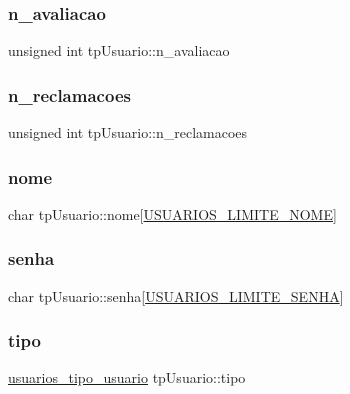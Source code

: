 \subsubsection{\texorpdfstring{n\+\_\+avaliacao}{n\_avaliacao}}
{\footnotesize\ttfamily unsigned int tp\+Usuario\+::n\+\_\+avaliacao}

\mbox{\label{structtpUsuario_a4aed6ac960a0dfadc0a3f8c2777b3709}} 
\subsubsection{\texorpdfstring{n\+\_\+reclamacoes}{n\_reclamacoes}}
{\footnotesize\ttfamily unsigned int tp\+Usuario\+::n\+\_\+reclamacoes}

\mbox{\label{structtpUsuario_a069080ebc30772aa5fd2898e7678c105}} 
\subsubsection{\texorpdfstring{nome}{nome}}
{\footnotesize\ttfamily char tp\+Usuario\+::nome\mbox{[}\hyperlink{usuarios_8h_a0366566babff2729e59e21514e8732fe}{U\+S\+U\+A\+R\+I\+O\+S\+\_\+\+L\+I\+M\+I\+T\+E\+\_\+\+N\+O\+ME}\mbox{]}}

\mbox{\label{structtpUsuario_a6ee0e2c16c084ede5698b3df0b10a590}} 
\subsubsection{\texorpdfstring{senha}{senha}}
{\footnotesize\ttfamily char tp\+Usuario\+::senha\mbox{[}\hyperlink{usuarios_8h_a66457e61856e5ef8d5f67f16ce7c1145}{U\+S\+U\+A\+R\+I\+O\+S\+\_\+\+L\+I\+M\+I\+T\+E\+\_\+\+S\+E\+N\+HA}\mbox{]}}

\mbox{\label{structtpUsuario_abaed1508280c5655463a1ceae4cb3050}} 
\subsubsection{\texorpdfstring{tipo}{tipo}}
{\footnotesize\ttfamily \hyperlink{usuarios_8h_aa2a00b8c6c7832d541985ec93d0b12e3}{usuarios\+\_\+tipo\+\_\+usuario} tp\+Usuario\+::tipo}

